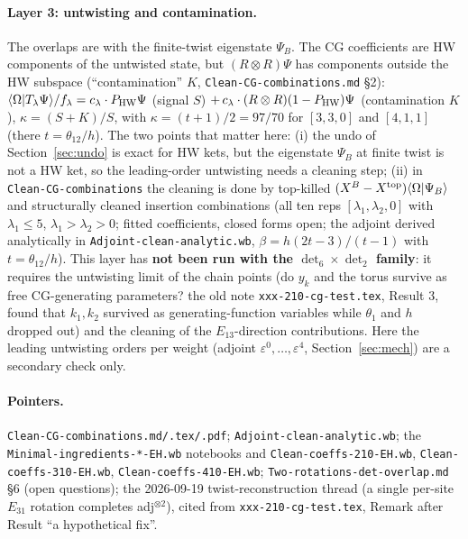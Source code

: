 \documentclass[11pt]{article}
\newcommand{\Om}{\Omega}
\newcommand{\nb}[1]{\texttt{#1}}
\begin{document}
\paragraph{Layer 3: untwisting and contamination.} The overlaps are with the finite-twist eigenstate $\Psi_B$. The CG coefficients are HW components of the untwisted state, but $(R\otimes R)\Psi$ has components outside the HW subspace (``contamination'' $K$, \nb{Clean-CG-combinations.md} \S2): $\langle\Om|T_\lambda\Psi\rangle/f_\lambda=c_\lambda\cdot P_{\rm HW}\Psi$ (signal $S$) $+\,c_\lambda\cdot(R\otimes R)(1-P_{\rm HW})\Psi$ (contamination $K$), $\kappa=(S+K)/S$, with $\kappa=(t+1)/2=97/70$ for $[3,3,0]$ and $[4,1,1]$ (there $t=\theta_{12}/h$). The two points that matter here: (i) the undo of Section~\ref{sec:undo} is exact for HW kets, but the eigenstate $\Psi_B$ at finite twist is not a HW ket, so the leading-order untwisting needs a cleaning step; (ii) in \nb{Clean-CG-combinations} the cleaning is done by top-killed $(X^B-X^{\rm top})\langle\Om|\Psi_B\rangle$ and structurally cleaned insertion combinations (all ten reps $[\lambda_1,\lambda_2,0]$ with $\lambda_1\le5$, $\lambda_1>\lambda_2>0$; fitted coefficients, closed forms open; the adjoint derived analytically in \nb{Adjoint-clean-analytic.wb}, $\beta=h(2t-3)/(t-1)$ with $t=\theta_{12}/h$). This layer has \textbf{not been run with the $\det_6\times\det_2$ family}: it requires the untwisting limit of the chain points (do $y_k$ and the torus survive as free CG-generating parameters? the old note \nb{xxx-210-cg-test.tex}, Result 3, found that $k_1,k_2$ survived as generating-function variables while $\theta_1$ and $h$ dropped out) and the cleaning of the $E_{13}$-direction contributions. Here the leading untwisting orders per weight (adjoint $\varepsilon^0,\ldots,\varepsilon^4$, Section~\ref{sec:mech}) are a secondary check only.

\paragraph{Pointers.} \nb{Clean-CG-combinations.md/.tex/.pdf}; \nb{Adjoint-clean-analytic.wb}; the \nb{Minimal-ingredients-*-EH.wb} notebooks and \nb{Clean-coeffs-210-EH.wb}, \nb{Clean-coeffs-310-EH.wb}, \nb{Clean-coeffs-410-EH.wb}; \nb{Two-rotations-det-overlap.md} \S6 (open questions); the 2026-09-19 twist-reconstruction thread (a single per-site $E_{31}$ rotation completes adj$^{\otimes2}$), cited from \nb{xxx-210-cg-test.tex}, Remark after Result ``a hypothetical fix''.

\end{document}

